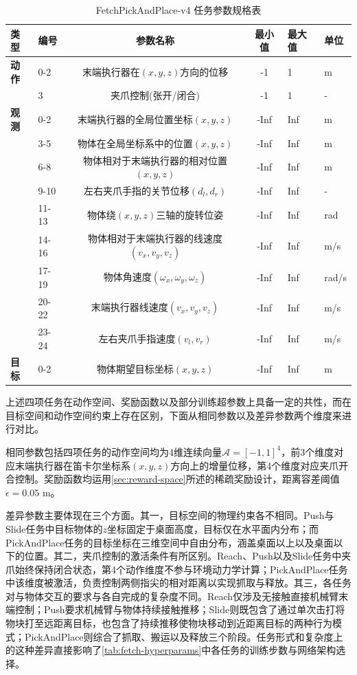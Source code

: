\begin{table}[!htb]
  \caption{FetchPickAndPlace-v4 任务参数规格表}\label{tab:fetch-pickplace-full}
  \centering
  \small
  \begin{tabular}{@{} llccll @{}} \toprule
    \textbf{类型} & \textbf{编号} & \textbf{参数名称} & \textbf{最小值} & \textbf{最大值} & \textbf{单位} \\ \midrule
    \textbf{动作} & 0-2 & 末端执行器在$(x, y, z)$方向的位移 & -1 & 1 & m \\
    & 3 & 夹爪控制(张开/闭合) & -1 & 1 & - \\ \midrule
    \textbf{观测} & 0-2 & 末端执行器的全局位置坐标$(x, y, z)$ & -Inf & Inf & m \\
    & 3-5 & 物体在全局坐标系中的位置$(x, y, z)$ & -Inf & Inf & m \\
    & 6-8 & 物体相对于末端执行器的相对位置$(x, y, z)$ & -Inf & Inf & m \\
    & 9-10 & 左右夹爪手指的关节位移$(d_l, d_r)$ & -Inf & Inf & - \\
    & 11-13 & 物体绕$(x, y, z)$三轴的旋转位姿 & -Inf & Inf & rad \\
    & 14-16 & 物体相对于末端执行器的线速度$(v_x, v_y, v_z)$ & -Inf & Inf & m/s \\
    & 17-19 & 物体角速度$(\omega_x, \omega_y, \omega_z)$ & -Inf & Inf & rad/s \\
    & 20-22 & 末端执行器线速度$(v_x, v_y, v_z)$ & -Inf & Inf & m/s \\
    & 23-24 & 左右夹爪手指速度$(v_{l}, v_{r})$  & -Inf & Inf & m/s \\ \midrule
    \textbf{目标} & 0-2 & 物体期望目标坐标$(x, y, z)$ & -Inf & Inf & m \\ \bottomrule
  \end{tabular}
\end{table}

上述四项任务在动作空间、奖励函数以及部分训练超参数上具备一定的共性，而在目标空间和动作空间约束上存在区别，下面从相同参数以及差异参数两个维度来进行对比。

相同参数包括四项任务的动作空间均为4维连续向量$\mathcal{A} = [-1, 1]^4$，前3个维度对应末端执行器在笛卡尔坐标系$(x, y, z)$方向上的增量位移，第4个维度对应夹爪开合控制。奖励函数均运用\cref{sec:reward-space}所述的稀疏奖励设计，距离容差阈值$\epsilon = 0.05$ m。

差异参数主要体现在三个方面。其一，目标空间的物理约束各不相同。Push与Slide任务中目标物体的$z$坐标固定于桌面高度，目标仅在水平面内分布；而PickAndPlace任务的目标坐标在三维空间中自由分布，涵盖桌面以上以及桌面以下的位置。其二，夹爪控制的激活条件有所区别。Reach、Push以及Slide任务中夹爪始终保持闭合状态，第4个动作维度不参与环境动力学计算；PickAndPlace任务中该维度被激活，负责控制两侧指尖的相对距离以实现抓取与释放。其三，各任务对与物体交互的要求与各自完成的复杂度不同。Reach仅涉及无接触直接机械臂末端控制；Push要求机械臂与物体持续接触推移；Slide则既包含了通过单次击打将物块打至远距离目标，也包含了持续推移使物块移动到近距离目标的两种行为模式；PickAndPlace则综合了抓取、搬运以及释放三个阶段。任务形式和复杂度上的这种差异直接影响了\cref{tab:fetch-hyperparams}中各任务的训练步数与网络架构选择。

